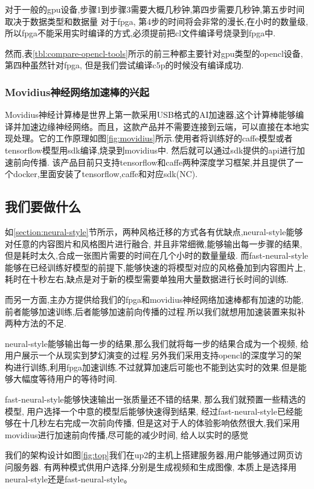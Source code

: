 对于一般的gpu设备,步骤1到步骤3需要大概几秒钟,第四步需要几秒钟,第五步时间取决于数据类型和数据量
对于fpga, 第4步的时间将会非常的漫长,在小时的数量级,所以fpga不能采用实时编译的方式,必须提前把cl文件编译号烧录到fpga中.

然而,表\ref{tbl:compare-opencl-tools}所示的前三种都主要针对gpu类型的opencl设备,第四种虽然针对fpga, 但是我们尝试编译c5p的时候没有编译成功.

\subsubsection{Movidius神经网络加速棒的兴起}
Movidius神经计算棒是世界上第一款采用USB格式的AI加速器,这个计算棒能够编译并加速边缘神经网络。而且，这款产品并不需要连接到云端，可以直接在本地实现处理。它的工作原理如图\ref{fig:movidius}所示.使用者将训练好的caffe模型或者tensorflow模型用sdk编译,烧录到movidius中. 然后就可以通过sdk提供的api进行加速前向传播.
该产品目前只支持tensorflow和caffe两种深度学习框架,并且提供了一个docker,里面安装了tensorflow,caffe和对应sdk(NC).
\subsection{我们要做什么}
如\ref{section:neural-style}节所示，两种风格迁移的方式各有优缺点,neural-style能够对任意的内容图片和风格图片进行融合, 并且非常细微,能够输出每一步骤的结果,但是耗时太久,合成一张图片需要的时间在几个小时的数量量级. 而fast-neural-style能够在已经训练好模型的前提下,能够快速的将模型对应的风格叠加到内容图片上, 耗时在十秒左右,缺点是对于新的模型需要单独用大量数据进行长时间的训练.

而另一方面,主办方提供给我们的fpga和movidius神经网络加速棒都有加速的功能,前者能够加速训练,后者能够加速前向传播的过程.所以我们就想用加速装置来拟补两种方法的不足.

neural-style能够输出每一步的结果,那么我们就将每一步的结果合成为一个视频, 给用户展示一个从现实到梦幻演变的过程.另外我们采用支持opencl的深度学习的架构进行训练,利用fpga加速训练.不过就算加速后可能也不能到达实时的效果.但是能够大幅度等待用户的等待时间.

fast-neural-style能够快速输出一张质量还不错的结果, 那么我们就预置一些精选的模型,
用户选择一个中意的模型后能够快速得到结果, 经过fast-neural-style已经能够在十几秒左右完成一次前向传播,
但是这对于人的体验影响依然很大,我们采用movidius进行加速前向传播,尽可能的减少时间, 给人以实时的感觉

我们的架构设计如图\ref{fig:top}我们在up2的主机上搭建服务器,用户能够通过网页访问服务器. 
有两种模式供用户选择,分别是生成视频和生成图像, 本质上是选择用neural-style还是fast-neural-style。

